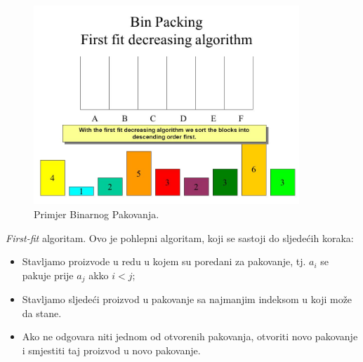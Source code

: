 \documentclass[a4paper, utf8, 11pt, colorlinks]{article}
\begin{document}
\begin{figure}
	\centering
	\includegraphics[width=100mm]{bin-packing}
	\caption{Primjer Binarnog Pakovanja.}
    \label{fig:bin-packing}
\end{figure}
 \emph{First-fit} algoritam. Ovo je pohlepni algoritam, koji se sastoji do sljedećih koraka:
\begin{itemize}
	\item Stavljamo proizvode u redu u kojem su poredani za pakovanje, tj. $a_i$ se pakuje prije $a_j$ akko $i < j$;
	\item Stavljamo sljedeći proizvod u pakovanje sa najmanjim indeksom u koji može da stane. \item Ako ne odgovara niti jednom od otvorenih pakovanja, otvoriti novo pakovanje i smjestiti taj proizvod u novo pakovanje.
\end{itemize}
\end{document}
